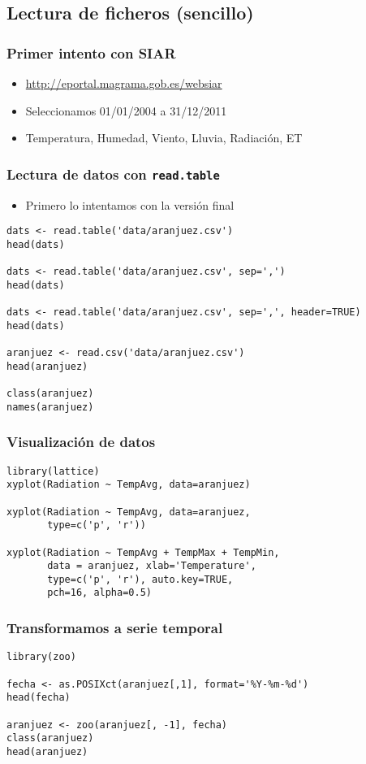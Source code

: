 \documentclass[bigger]{beamer}
\begin{document}
\subsection{Lectura de ficheros (sencillo)}
\label{sec-1-2}
\begin{frame}
\frametitle{Primer intento con SIAR}
\label{sec-1-2-1}

\begin{itemize}
\item \url{http://eportal.magrama.gob.es/websiar}
\item Seleccionamos 01/01/2004 a 31/12/2011
\item Temperatura, Humedad, Viento, Lluvia, Radiación, ET
\end{itemize}
\end{frame}
\begin{frame}[fragile]
\frametitle{Lectura de datos con \texttt{read.table}}
\label{sec-1-2-2}

\begin{itemize}
\item Primero lo intentamos con la versión final
\end{itemize}

\lstset{language=R}
\begin{lstlisting}
dats <- read.table('data/aranjuez.csv')
head(dats)

dats <- read.table('data/aranjuez.csv', sep=',')
head(dats)

dats <- read.table('data/aranjuez.csv', sep=',', header=TRUE)
head(dats)

aranjuez <- read.csv('data/aranjuez.csv')
head(aranjuez)

class(aranjuez)
names(aranjuez)
\end{lstlisting}
\end{frame}
\begin{frame}[fragile]
\frametitle{Visualización de datos}
\label{sec-1-2-3}


\lstset{language=R}
\begin{lstlisting}
library(lattice)
xyplot(Radiation ~ TempAvg, data=aranjuez)

xyplot(Radiation ~ TempAvg, data=aranjuez,
       type=c('p', 'r'))

xyplot(Radiation ~ TempAvg + TempMax + TempMin,
       data = aranjuez, xlab='Temperature',
       type=c('p', 'r'), auto.key=TRUE,
       pch=16, alpha=0.5)
\end{lstlisting}
\end{frame}
\begin{frame}[fragile]
\frametitle{Transformamos a serie temporal}
\label{sec-1-2-4}



\lstset{language=R}
\begin{lstlisting}
library(zoo)

fecha <- as.POSIXct(aranjuez[,1], format='%Y-%m-%d')
head(fecha)

aranjuez <- zoo(aranjuez[, -1], fecha)
class(aranjuez)
head(aranjuez)
\end{lstlisting}
\end{frame}
\end{document}
